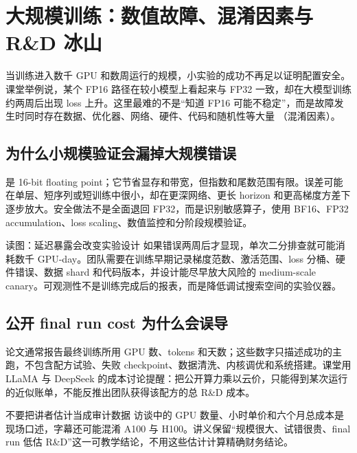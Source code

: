 \section{大规模训练：数值故障、混淆因素与 R\&D 冰山}

当训练进入数千 GPU 和数周运行的规模，小实验的成功不再足以证明配置安全。课堂举例说，某个 FP16 路径在较小模型上看起来与 FP32 一致，却在大模型训练约两周后出现 loss 上升。这里最难的不是“知道 FP16 可能不稳定”，而是故障发生时同时存在数据、优化器、网络、硬件、代码和随机性等大量 （混淆因素）。

\subsection{为什么小规模验证会漏掉大规模错误}

 是 16-bit floating point；它节省显存和带宽，但指数和尾数范围有限。误差可能在单层、短序列或短训练中很小，却在更深网络、更长 horizon 和更高梯度方差下逐步放大。安全做法不是全面退回 FP32，而是识别敏感算子，使用 BF16、FP32 accumulation、loss scaling、数值监控和分阶段规模验证。


\begin{knowledgebox}{读图：延迟暴露会改变实验设计}
如果错误两周后才显现，单次二分排查就可能消耗数千 GPU-day。团队需要在训练早期记录梯度范数、激活范围、loss 分桶、硬件错误、数据 shard 和代码版本，并设计能尽早放大风险的 medium-scale canary。可观测性不是训练完成后的报表，而是降低调试搜索空间的实验仪器。
\end{knowledgebox}

\subsection{公开 final run cost 为什么会误导}

论文通常报告最终训练所用 GPU 数、tokens 和天数；这些数字只描述成功的主跑，不包含配方试验、失败 checkpoint、数据清洗、内核调优和系统搭建。课堂用 LLaMA 与 DeepSeek 的成本讨论提醒：把公开算力乘以云价，只能得到某次运行的近似账单，不能反推出团队获得该配方的总 R\&D 成本。


\begin{warningbox}{不要把讲者估计当成审计数据}
访谈中的 GPU 数量、小时单价和六个月总成本是现场口述，字幕还可能混淆 A100 与 H100。讲义保留“规模很大、试错很贵、final run 低估 R\&D”这一可教学结论，不用这些估计计算精确财务结论。
\end{warningbox}


